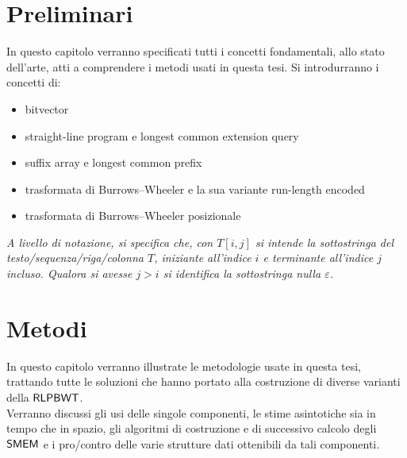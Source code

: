 \documentclass[a4paper,12pt, oneside]{book}
\def\RLPBWT{\mbox{\rm {\sf RLPBWT}}}
\def\SMEM{\mbox{\rm {\sf SMEM}}}
\begin{document}
\chapter{Preliminari}
\label{prechap}
In questo capitolo verranno specificati tutti i concetti fondamentali, allo
stato dell'arte, atti a comprendere i metodi usati in questa tesi.
Si introdurranno i concetti di:
\begin{itemize}
  \item bitvector
  \item straight-line program e longest common extension query
  \item suffix array e longest common prefix
  \item trasformata di Burrows--Wheeler e la sua variante run-length encoded
  \item trasformata di Burrows--Wheeler posizionale
\end{itemize}
\noindent
\textit{A livello di notazione, si specifica che, con
  $T[i,j]$ si intende la sottostringa del testo/sequenza/riga/colonna $T$,
  iniziante all'indice $i$ e terminante all'indice $j$ incluso. Qualora si
  avesse $j>i$ si identifica la sottostringa nulla $\varepsilon$.}

%












\chapter{Metodi}
\label{metchap}
In questo capitolo verranno illustrate le metodologie usate in questa tesi,
trattando tutte le soluzioni
che hanno portato alla costruzione di diverse varianti della $\RLPBWT$.\\
Verranno discussi gli usi delle singole componenti, le stime asintotiche sia in
tempo che in spazio, gli algoritmi di costruzione e di successivo calcolo degli
$\SMEM$ e i pro/contro delle varie strutture dati
ottenibili da tali componenti.









\end{document}
